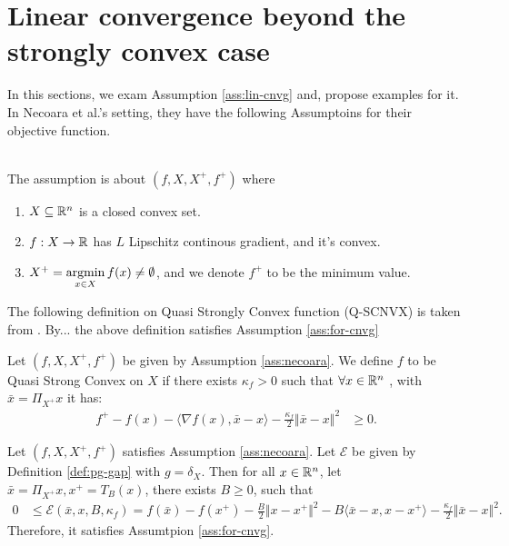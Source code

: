 \documentclass[12pt]{article}
\begin{document}
\section{Linear convergence beyond the strongly convex case}
    In this sections, we exam Assumption \ref{ass:lin-cnvg} and, propose examples for it. 
    In Necoara et al.'s setting, they have the following Assumptoins for their objective function. 
    \begin{assumption}\;\label{ass:necoara}\\
        The assumption is about $(f, X, X^+, f^+)$ where 
        \begin{enumerate}[nosep]
            \item $X \subseteq \mathbb R^n$ is a closed convex set. 
            \item $f: X\rightarrow \mathbb R$ has $L$ Lipschitz continous gradient, and it's convex. 
            \item $X^+ = \mathop{\rm argmin}\limits_{x \in X} f(x)\neq \emptyset$, and we denote $f^+$ to be the minimum value. 
        \end{enumerate}
    \end{assumption}
    The following definition on Quasi Strongly Convex function (Q-SCNVX) is taken from \cite[Definition 1]{necoara_linear_2019}. 
    By... the above definition satisfies Assumption \ref{ass:for-cnvg} 
    \begin{definition}[Q-SCNVX]\label{def:Q-SCNVX}
        Let $(f, X, X^+, f^+)$ be given by Assumption \ref{ass:necoara}. 
        We define $f$ to be Quasi Strong Convex on $X$ if there exists $\kappa_f  > 0$ such that $\forall x \in \mathbb R^n$ , with $\bar x = \Pi_{X^+}x$ it has:
        \begin{align*}
            f^+ - f(x) - \langle \nabla f(x), \bar x - x\rangle - \frac{\kappa_f}{2}\Vert \bar x - x\Vert^2 
            &\ge 0. 
        \end{align*}
    \end{definition}
    \begin{proposition}\label{prop:qscnvx-ass-ok}
        Let $(f, X, X^+, f^+)$ satisfies Assumption \ref{ass:necoara}.
        Let $\mathcal E$ be given by Definition \ref{def:pg-gap} with $g = \delta_X$. 
        Then for all $x \in \mathbb R^n$, let $\bar x = \Pi_{X^+}x, x^+ = T_B(x)$, there exists $B \ge 0$, such that 
        \begin{align*}
            0 &\le 
            \mathcal E(\bar x, x, B, \kappa_f)
            = 
            f(\bar x) - f(x^+) 
            - \frac{B}{2}\Vert x - x^+\Vert^2 
            - B\langle \bar x - x, x - x^+\rangle
            - \frac{\kappa_f}{2}\Vert \bar x - x\Vert^2. 
        \end{align*}
        Therefore, it satisfies Assumtpion \ref{ass:for-cnvg}. 
    \end{proposition}
\end{document}
